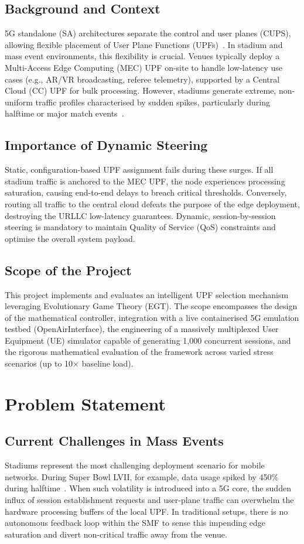 \documentclass[11pt,a4paper,english]{article}
\begin{document}
\subsection{Background and Context}
5G standalone (SA) architectures separate the control and user planes (CUPS), allowing flexible placement of User Plane Functions (UPFs)~\cite{3gpp_ts23501}. In stadium and mass event environments, this flexibility is crucial. Venues typically deploy a Multi-Access Edge Computing (MEC) UPF on-site to handle low-latency use cases (e.g., AR/VR broadcasting, referee telemetry), supported by a Central Cloud (CC) UPF for bulk processing. However, stadiums generate extreme, non-uniform traffic profiles characterised by sudden spikes, particularly during halftime or major match events~\cite{superbowl_lvii}.

\subsection{Importance of Dynamic Steering}
Static, configuration-based UPF assignment fails during these surges. If all stadium traffic is anchored to the MEC UPF, the node experiences processing saturation, causing end-to-end delays to breach critical thresholds. Conversely, routing all traffic to the central cloud defeats the purpose of the edge deployment, destroying the URLLC low-latency guarantees. Dynamic, session-by-session steering is mandatory to maintain Quality of Service (QoS) constraints and optimise the overall system payload.

\subsection{Scope of the Project}
This project implements and evaluates an intelligent UPF selection mechanism leveraging Evolutionary Game Theory (EGT). The scope encompasses the design of the mathematical controller, integration with a live containerised 5G emulation testbed (OpenAirInterface), the engineering of a massively multiplexed User Equipment (UE) simulator capable of generating 1,000 concurrent sessions, and the rigorous mathematical evaluation of the framework across varied stress scenarios (up to 10$\times$ baseline load).

\section{Problem Statement}
\subsection{Current Challenges in Mass Events}
Stadiums represent the most challenging deployment scenario for mobile networks. During Super Bowl LVII, for example, data usage spiked by 450\% during halftime~\cite{superbowl_lvii}. When such volatility is introduced into a 5G core, the sudden influx of session establishment requests and user-plane traffic can overwhelm the hardware processing buffers of the local UPF. In traditional setups, there is no autonomous feedback loop within the SMF to sense this impending edge saturation and divert non-critical traffic away from the venue.
\end{document}
